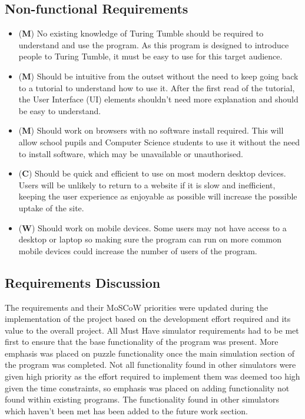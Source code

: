 \documentclass{l4proj}
\begin{document}
\subsection{Non-functional Requirements}
\begin{itemize}
    \item (\textbf{M}) No existing knowledge of Turing Tumble should be required to understand and use the program. As this program is designed to introduce people to Turing Tumble, it must be easy to use for this target audience.
    \item (\textbf{M}) Should be intuitive from the outset without the need to keep going back to a tutorial to understand how to use it. After the first read of the tutorial, the User Interface (UI) elements shouldn't need more explanation and should be easy to understand.
    \item (\textbf{M}) Should work on browsers with no software install required. This will allow school pupils and Computer Science students to use it without the need to install software, which may be unavailable or unauthorised.
    \item (\textbf{C}) Should be quick and efficient to use on most modern desktop devices. Users will be unlikely to return to a website if it is slow and inefficient, keeping the user experience as enjoyable as possible will increase the possible uptake of the site.
    \item (\textbf{W}) Should work on mobile devices. Some users may not have access to a desktop or laptop so making sure the program can run on more common mobile devices could increase the number of users of the program.
\end{itemize}

\subsection{Requirements Discussion}
The requirements and their MoSCoW priorities were updated during the implementation of the project based on the development effort required and its value to the overall project. All Must Have simulator requirements had to be met first to ensure that the base functionality of the program was present. More emphasis was placed on puzzle functionality once the main simulation section of the program was completed. Not all functionality found in other simulators were given high priority as the effort required to implement them was deemed too high given the time constraints, so emphasis was placed on adding functionality not found within existing programs. The functionality found in other simulators which haven't been met has been added to the future work section.
\end{document}
